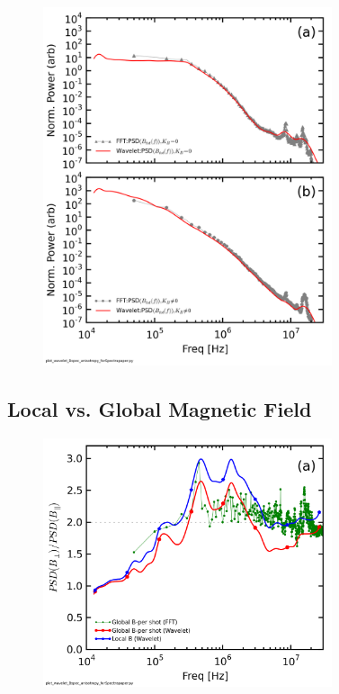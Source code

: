 \documentclass[aip,prl,amsmath,amssymb,reprint,superscriptaddress]{revtex4-1} %
\begin{document}
\begin{figure}[!htbp]
\centerline{
\includegraphics[width=8.5cm]{Bperppara_chan1t4_WaveletvsFFT_40t60us}}
\caption{\label{fig:WavevsFFT}}
\end{figure}

\subsection{Local vs. Global Magnetic Field}

\begin{figure}[!htbp]
\centerline{
\includegraphics[width=8.5cm]{BperpparaGlobalBcomp_chan1t4_1mWbspectra}}
\caption{\label{fig:globalcomparison}}
\end{figure}
\end{document}
